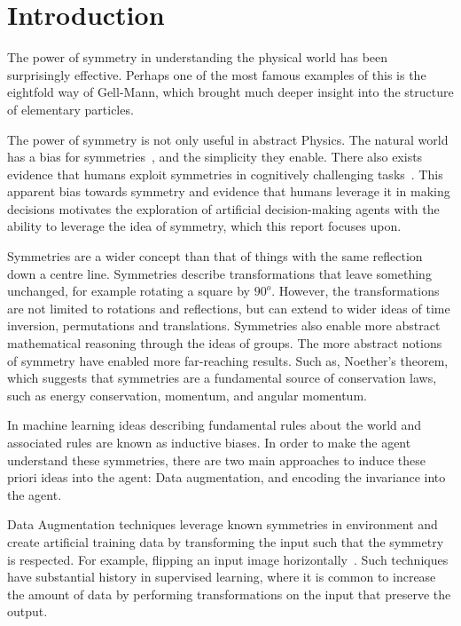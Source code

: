 \chapter{Introduction}\label{Chap1}
The power of symmetry in understanding the physical world has been surprisingly effective. Perhaps one of the most famous examples of this is the eightfold way of Gell-Mann\cite{gellmann1961eight}, which brought much deeper insight into the structure of elementary particles.

The power of symmetry is not only useful in abstract Physics. The natural world has a bias for symmetries~\cite{johnston2022symmetry}, and the simplicity they enable. There also exists evidence that humans exploit symmetries in cognitively challenging tasks~\cite{he2022symmetry}. This apparent bias towards symmetry and evidence that humans leverage it in making decisions  motivates the exploration of artificial decision-making agents with the ability to leverage the idea of symmetry, which this report focuses upon.


Symmetries are a wider concept than that of things with the same reflection down a centre line. Symmetries describe transformations that leave something unchanged, for example rotating a square by $90^o$. However, the transformations are not limited to rotations and reflections, but can extend to wider ideas of time inversion, permutations and translations. Symmetries also enable more abstract mathematical reasoning through the ideas of groups. The more abstract notions of symmetry have enabled more far-reaching results. Such as, Noether's theorem, which suggests that symmetries are a fundamental source of conservation laws, such as energy conservation, momentum, and angular momentum.

In machine learning ideas describing fundamental rules about the world and associated rules are known as inductive biases. In order to make the agent understand these symmetries, there are two main approaches to induce these priori ideas into the agent: Data augmentation, and encoding the invariance into the agent.

Data Augmentation techniques leverage known symmetries in environment and create artificial training data by transforming the input such that the symmetry is respected. For example, flipping an input image horizontally~\cite{laskin2020reinforcement, yijion2020invariant}. Such techniques have substantial history in supervised learning, where it is common to increase the amount of data by performing transformations on the input that preserve the output.

